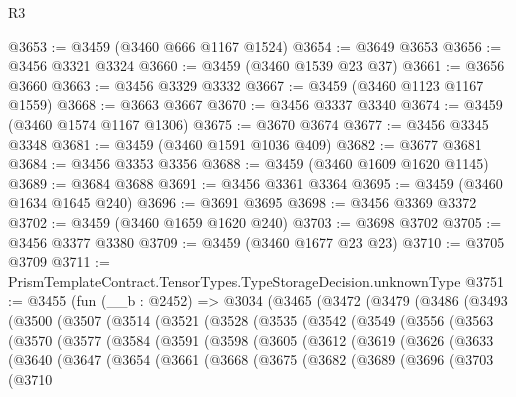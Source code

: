 \begin{lexlean}{R3}
\begin{coremodule}
@3653 := @3459 (@3460 @666 @1167 @1524)
@3654 := @3649 @3653
@3656 := @3456 @3321 @3324
@3660 := @3459 (@3460 @1539 @23 @37)
@3661 := @3656 @3660
@3663 := @3456 @3329 @3332
@3667 := @3459 (@3460 @1123 @1167 @1559)
@3668 := @3663 @3667
@3670 := @3456 @3337 @3340
@3674 := @3459 (@3460 @1574 @1167 @1306)
@3675 := @3670 @3674
@3677 := @3456 @3345 @3348
@3681 := @3459 (@3460 @1591 @1036 @409)
@3682 := @3677 @3681
@3684 := @3456 @3353 @3356
@3688 := @3459 (@3460 @1609 @1620 @1145)
@3689 := @3684 @3688
@3691 := @3456 @3361 @3364
@3695 := @3459 (@3460 @1634 @1645 @240)
@3696 := @3691 @3695
@3698 := @3456 @3369 @3372
@3702 := @3459 (@3460 @1659 @1620 @240)
@3703 := @3698 @3702
@3705 := @3456 @3377 @3380
@3709 := @3459 (@3460 @1677 @23 @23)
@3710 := @3705 @3709
@3711 := PrismTemplateContract.TensorTypes.TypeStorageDecision.unknownType
@3751 := @3455
    (fun (__b : @2452) =>
    @3034
      (@3465
        (@3472
          (@3479
            (@3486
              (@3493
                (@3500
                  (@3507
                    (@3514
                      (@3521
                        (@3528
                          (@3535
                            (@3542
                              (@3549
                                (@3556
                                  (@3563
                                    (@3570
                                      (@3577
                                        (@3584
                                          (@3591
                                            (@3598
                                              (@3605
                                                (@3612
                                                  (@3619
                                                    (@3626
                                                      (@3633
                                                        (@3640
                                                          (@3647
                                                            (@3654
                                                              (@3661
                                                                (@3668
                                                                  (@3675
                                                                    (@3682
                                                                      (@3689
                                                                        (@3696
                                                                          (@3703
                                                                            (@3710

\end{coremodule}
\end{lexlean}
